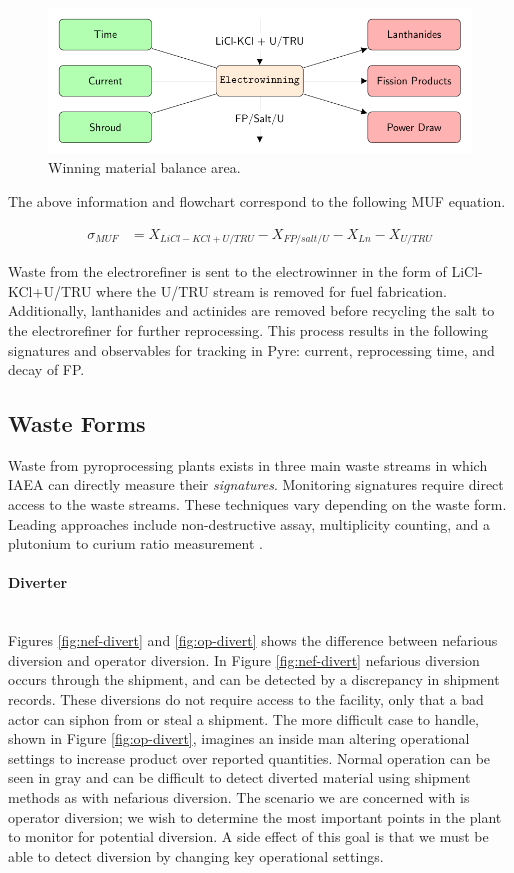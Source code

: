 \begin{figure}[h] 
	\centering
	\includegraphics[width=0.8\linewidth]{images/winning}
	\caption{Winning material balance area.}
	\label{fig:winning}
\end{figure}

The above information and flowchart correspond to the following MUF equation.

\begin{align}
\sigma_{MUF} &= X_{LiCl-KCl + U/TRU} - X_{FP/salt/U} - X_{Ln} - X_{U/TRU}
\end{align}

Waste from the electrorefiner is sent to the electrowinner in the form of LiCl-KCl+U/TRU where the U/TRU stream is removed for fuel fabrication. Additionally, lanthanides and actinides are removed before recycling the salt to the electrorefiner for further reprocessing. This process results in the following signatures and observables for tracking in Pyre: current, reprocessing time, and decay of FP. 

\subsection{Waste Forms}

Waste from pyroprocessing plants exists in three main waste streams in which IAEA can directly measure their \emph{signatures}. Monitoring signatures require direct access to the waste streams.
These techniques vary depending on the waste form. Leading approaches include non-destructive assay, multiplicity counting, and a plutonium to curium ratio measurement \cite{lee_determination_2012,root_see_2019}.

\paragraph{Diverter} \mbox{}\\
Figures \ref{fig:nef-divert} and \ref{fig:op-divert} shows the difference between nefarious diversion and operator diversion. In Figure \ref{fig:nef-divert} nefarious diversion occurs
through the shipment, and can be detected by a discrepancy in shipment records. These diversions do not require access to the facility, only that a bad actor can siphon from or steal a shipment. The more difficult case to handle, shown in Figure \ref{fig:op-divert}, imagines an inside man altering operational settings
to increase product over reported quantities. Normal operation can be seen in gray and can be difficult to detect diverted material using shipment methods as with nefarious diversion. The scenario we are concerned with is operator diversion; we wish to determine the most important points in the plant to monitor for potential
diversion. A side effect of this goal is that we must be able to detect diversion by changing key operational settings.

